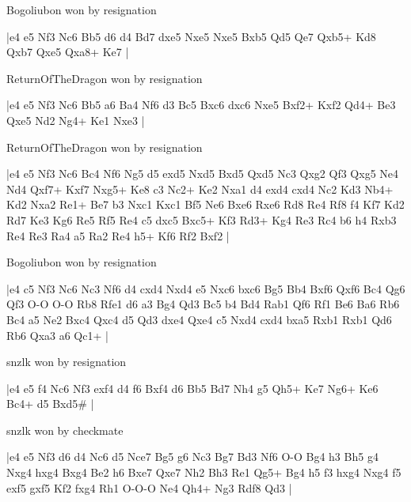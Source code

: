 \showboard

Bogoliubon won by resignation

\makegametitle
|e4 e5 Nf3 Nc6 Bb5 d6 d4 Bd7 dxe5 Nxe5 Nxe5 Bxb5 Qd5 Qe7 Qxb5+ Kd8 Qxb7 Qxe5 Qxa8+ Ke7  |

\showboard

ReturnOfTheDragon won by resignation

\makegametitle
|e4 e5 Nf3 Nc6 Bb5 a6 Ba4 Nf6 d3 Bc5 Bxc6 dxc6 Nxe5 Bxf2+ Kxf2 Qd4+ Be3 Qxe5 Nd2 Ng4+ Ke1 Nxe3  |

\showboard

ReturnOfTheDragon won by resignation

\makegametitle
|e4 e5 Nf3 Nc6 Bc4 Nf6 Ng5 d5 exd5 Nxd5 Bxd5 Qxd5 Nc3 Qxg2 Qf3 Qxg5 Ne4 Nd4 Qxf7+ Kxf7 Nxg5+ Ke8 c3 Nc2+ Ke2 Nxa1 d4 exd4 cxd4 Nc2 Kd3 Nb4+ Kd2 Nxa2 Re1+ Be7 b3 Nxc1 Kxc1 Bf5 Ne6 Bxe6 Rxe6 Rd8 Re4 Rf8 f4 Kf7 Kd2 Rd7 Ke3 Kg6 Re5 Rf5 Re4 c5 dxc5 Bxc5+ Kf3 Rd3+ Kg4 Re3 Rc4 b6 h4 Rxb3 Re4 Re3 Ra4 a5 Ra2 Re4 h5+ Kf6 Rf2 Bxf2  |

\showboard

Bogoliubon won by resignation

\makegametitle
|e4 c5 Nf3 Nc6 Nc3 Nf6 d4 cxd4 Nxd4 e5 Nxc6 bxc6 Bg5 Bb4 Bxf6 Qxf6 Bc4 Qg6 Qf3 O-O O-O Rb8 Rfe1 d6 a3 Bg4 Qd3 Bc5 b4 Bd4 Rab1 Qf6 Rf1 Be6 Ba6 Rb6 Bc4 a5 Ne2 Bxc4 Qxc4 d5 Qd3 dxe4 Qxe4 c5 Nxd4 cxd4 bxa5 Rxb1 Rxb1 Qd6 Rb6 Qxa3 a6 Qc1+  |

\showboard

snzlk won by resignation

\makegametitle
|e4 e5 f4 Nc6 Nf3 exf4 d4 f6 Bxf4 d6 Bb5 Bd7 Nh4 g5 Qh5+ Ke7 Ng6+ Ke6 Bc4+ d5 Bxd5\#  |

\showboard

snzlk won by checkmate

\makegametitle
|e4 e5 Nf3 d6 d4 Nc6 d5 Nce7 Bg5 g6 Nc3 Bg7 Bd3 Nf6 O-O Bg4 h3 Bh5 g4 Nxg4 hxg4 Bxg4 Be2 h6 Bxe7 Qxe7 Nh2 Bh3 Re1 Qg5+ Bg4 h5 f3 hxg4 Nxg4 f5 exf5 gxf5 Kf2 fxg4 Rh1 O-O-O Ne4 Qh4+ Ng3 Rdf8 Qd3  |

